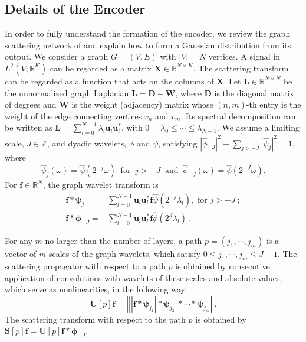 \documentclass[conference]{IEEEtran}
\def\l{\lambda}
\def\RR{\mathbb{R}}
\def\ZZ{\mathbb{Z}}
\def\BD{\boldsymbol{D}}
\def\BL{\boldsymbol{L}}
\def\BS{\boldsymbol{S}}
\def\BU{\boldsymbol{U}}
\def\BW{\boldsymbol{W}}
\def\BX{\boldsymbol{X}}
\def\Bf{\boldsymbol{f}}
\def\Bu{\boldsymbol{u}}
\def\Bphi{\boldsymbol{\phi}}
\def\Bpsi{\boldsymbol{\psi}}
\newcommand{\abs}[1]{\left| #1 \right|}
\begin{document}
\subsection{Details of the Encoder}
\label{sec:graph_scat_encode}
In order to fully understand the formation of the encoder, we review the graph scattering network of \cite{zou2018graph} and explain how to form a Gaussian distribution from its output. We consider a graph $G = (V, E)$ with $\abs{V} = N$ vertices. A signal in $L^2(V; \RR^K)$ can be regarded as a matrix $\BX \in \RR^{N \times K}$. The scattering transform can be regarded as a function that acts on the columns of $\BX$.
Let $\BL \in \RR^{N \times N}$ be the unnormalized graph Laplacian $\BL = \BD - \BW$, where $\BD$ is the diagonal matrix of degrees and $\BW$ is the weight (adjacency) matrix whose $(n,m)$-th entry is the weight of the edge connecting vertices $v_n$ and $v_m$. Its spectral decomposition can be written as 
$    \BL = \sum_{l=0}^{N-1} \l_l \Bu_l \Bu_l^*$, with $0 = \l_0 \leq \cdots \leq \l_{N-1}$. 
We assume a limiting scale, $J \in \ZZ$, and dyadic wavelets, $\phi$ and $\psi$, satisfying $|\hat{\phi}_{-J}|^2 + \sum_{j > -J} |\hat{\psi}_j|^2 = 1$, 
where $$\hat{\psi}_j (\omega) = \hat{\psi}(2^{-j} \omega) \ \text{ for } \ j > -J \ \text{ and } \ \hat{\phi}_{-J} (\omega) = \hat{\phi}(2^{-J} \omega).$$
For $\Bf \in \RR^N$, the graph wavelet transform \cite{hammond2011wavelets}
is
\begin{equation*}
\begin{aligned}
\Bf \ast \boldsymbol{\psi}_j = & \sum_{l=0}^{N-1} \Bu_l \Bu_l^* \Bf \hat{\psi}(2^{-j} \l_l), \text{ for } j>-J ~; \\
\Bf \ast \boldsymbol{\phi}_{-J} = & \sum_{l=0}^{N-1} \Bu_l \Bu_l^* \Bf \hat{\phi}(2^{J} \l_l)~. 
\end{aligned}
\end{equation*}

For any $m$ no larger than the number of layers, a path $p = (j_1, \cdots, j_m)$ is a vector of $m$ scales of the graph wavelets, which satisfy $0 \leq j_1, \cdots, j_m \leq J-1$. The scattering propagator with respect to a path $p$ is obtained by consecutive application of convolutions with wavelets of these scales and absolute values, which serve as nonlinearities, in the following way 
\begin{equation*}
    \BU[p] \Bf = \abs{ \abs{ \abs{\Bf \ast \Bpsi_{j_1}} \ast \Bpsi_{j_2} } \ast \cdots \ast \Bpsi_{j_m} } ~.
\end{equation*}
The scattering transform with respect to the path $p$ is obtained by 
$\BS[p] \Bf  = \BU[p] \Bf \ast \Bphi_{-J}$.
\end{document}

